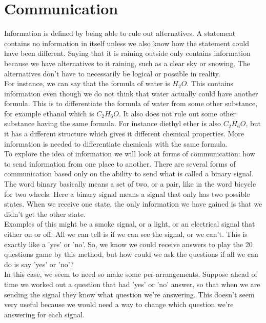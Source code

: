 \section{Communication}

Information is defined by being able to rule out alternatives. A statement contains no information in itself unless we also know how the statement could have been different. Saying that it is raining outside only contains information because we have alternatives to it raining, such as a clear sky or snowing. The alternatives don't have to necessarily be logical or possible in reality. \\

For instance, we can say that the formula of water is $H_2 O$. This contains information even though we do not think that water actually could have another formula. This is to differentiate the formula of water from some other substance, for example ethanol which is $C_2 H_6 O$. It also does not rule out some other substance having the same formula. For instance diethyl ether is also $C_2 H_6 O$, but it has a different structure which gives it different chemical properties. More information is needed to differentiate chemicals with the same formula.\\

To explore the idea of information we will look at forms of communication: how to send information from one place to another. There are several forms of communication based only on the ability to send what is called a binary signal. The word binary basically means a set of two, or a pair, like in the word bicycle for two wheels. Here a binary signal means a signal that only has two possible states. When we receive one state, the only information we have gained is that we didn't get the other state.\\

Examples of this might be a smoke signal, or a light, or an electrical signal that either on or off. All we can tell is if we can see the signal, or we can't. This is exactly like a 'yes' or 'no'. So, we know we could receive answers to play the 20 questions game by this method, but how could we ask the questions if all we can do is say 'yes' or 'no'?\\

In this case, we seem to need so make some per-arrangements. Suppose ahead of time we worked out a question that had 'yes' or 'no' answer, so that when we are sending the signal they know what question we're answering. This doesn't seem very useful because we would need a way to change which question we're answering for each signal.\\

